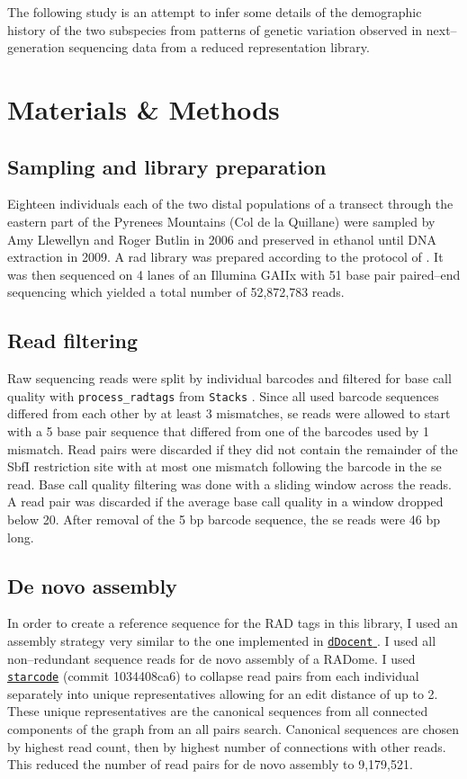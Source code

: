 \documentclass[a4paper,12pt,times,authoryear,twoside,print,index]{Classes/PhDThesisPSnPDF}\usepackage[]{graphicx}\usepackage[]{color}
\begin{document}
The following study is an attempt to infer some details of the demographic history of the two subspecies from patterns of genetic variation observed in next--generation sequencing data from a reduced representation library.

%
%
%
\section{Materials \& Methods}
%
%
%
%
%
\subsection{Sampling and library preparation}

Eighteen individuals each of the two distal populations of a transect through the eastern part of the Pyrenees Mountains (Col de la Quillane) were sampled by Amy Llewellyn and Roger Butlin in 2006 and preserved in ethanol until DNA extraction in 2009. A \gls{rad} library was prepared according to the protocol of \cite{Baird2008}. It was then sequenced on 4 lanes of an Illumina GAIIx with 51 base pair paired--end sequencing which yielded a total number of 52,872,783 reads.
%
%
\subsection{Read filtering}
%
%
Raw sequencing reads were split by individual barcodes and filtered for base call quality with \texttt{process\_radtags} from \texttt{Stacks} \citep{Catchen2011}. Since all used barcode sequences differed from each other by at least 3 mismatches, \gls{se} reads were allowed to start with a 5 base pair sequence that differed from one of the barcodes used by 1 mismatch. Read pairs were discarded if they did not contain the remainder of the SbfI restriction site with at most one mismatch following the barcode in the \gls{se} read. Base call quality filtering was done with a sliding window across the reads. A read pair was discarded if the average base call quality in a window dropped below 20. After removal of the 5 bp barcode sequence, the \gls{se} reads were 46 bp long.
%
%
\subsection{De novo assembly}
%
%
In order to create a reference sequence for the RAD tags in this library, I used an assembly strategy very similar to the one implemented in \href{https://github.com/jpuritz/dDocent}{\texttt{dDocent} }\citep{Puritz2014a}. I used all non--redundant sequence reads for de novo assembly of a RADome. I used \href{https://github.com/gui11aume/starcode}{\texttt{starcode}} (commit 1034408ca6) \citep{Zorita2015} to collapse read pairs from each individual separately into unique representatives allowing for an \gls{edit distance} of up to 2. These unique representatives are the canonical sequences from all \glspl{connected component} of the graph from an \gls{all pairs} search. Canonical sequences are chosen by highest read count, then by highest number of connections with other reads. This reduced the number of read pairs for de novo assembly to 9,179,521.
\end{document}
